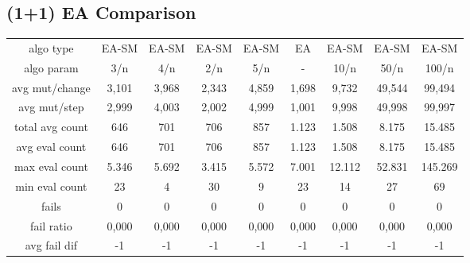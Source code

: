 \subsection{(1+1) EA Comparison}

\begin{tabular}[h]{ccccccccc}
algo type&          EA-SM&   EA-SM&   EA-SM&   EA-SM&      EA&   EA-SM&   EA-SM&   EA-SM\\
algo param&           3/n&     4/n&     2/n&     5/n&       -&    10/n&    50/n&   100/n\\
avg mut/change&     3,101&   3,968&   2,343&   4,859&   1,698&   9,732&  49,544&  99,494\\
avg mut/step&       2,999&   4,003&   2,002&   4,999&   1,001&   9,998&  49,998&  99,997\\
\hline
total avg count&      646&     701&     706&     857&   1.123&   1.508&   8.175&  15.485\\
avg eval count&       646&     701&     706&     857&   1.123&   1.508&   8.175&  15.485\\
max eval count&     5.346&   5.692&   3.415&   5.572&   7.001&  12.112&  52.831& 145.269\\
min eval count&        23&       4&      30&       9&      23&      14&      27&      69\\
\hline
fails&                  0&       0&       0&       0&       0&       0&       0&       0\\
fail ratio&         0,000&   0,000&   0,000&   0,000&   0,000&   0,000&   0,000&   0,000\\
avg fail dif&          -1&      -1&      -1&      -1&      -1&      -1&      -1&      -1\\
\end{tabular}

